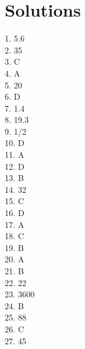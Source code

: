 \documentclass[../satmath.tex]{subfiles}
\begin{document}
\section*{Solutions}

1. 5.6\\
2. 35\\
3. C\\
4. A\\
5. 20\\
6. D\\
7. 1.4\\
8. 19.3\\
9. 1/2\\
10. D\\
11. A\\
12. D\\
13. B\\
14. 32\\
15. C\\
16. D\\
17. A\\
18. C\\
19. B\\
20. A\\
21. B\\
22. 22\\
23. 3600\\
24. B\\
25. 88\\
26. C\\
27. 45\\
\end{document}
